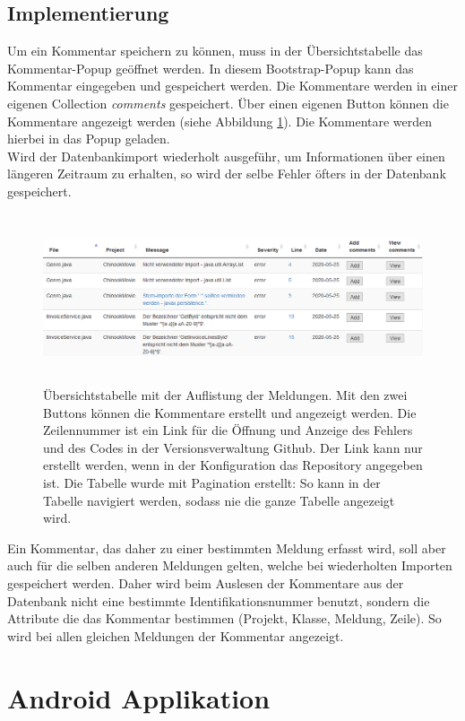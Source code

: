 \subsection{Implementierung}
Um ein Kommentar speichern zu können, muss in der Übersichtstabelle das Kommentar-Popup geöffnet werden. In diesem Bootstrap-Popup kann das Kommentar eingegeben und gespeichert werden. Die Kommentare werden in einer eigenen Collection \textit{comments} gespeichert. Über einen eigenen Button können die Kommentare angezeigt werden (siehe Abbildung \ref{fig:popup}). Die Kommentare werden hierbei in das Popup geladen. \\ Wird der Datenbankimport wiederholt ausgeführ, um Informationen über einen längeren Zeitraum zu erhalten, so wird der selbe Fehler öfters in der Datenbank gespeichert.
\begin{figure}[tp]
  \centering
  \includegraphics[height=5cm]{images/table.PNG}
 \caption[Übersichtstabelle]{Übersichtstabelle mit der Auflistung der Meldungen. Mit den zwei Buttons können die Kommentare erstellt und angezeigt werden. Die Zeilennummer ist ein Link für die Öffnung und Anzeige des Fehlers und des Codes in der Versionsverwaltung Github. Der Link kann nur erstellt werden, wenn in der Konfiguration das Repository angegeben ist. Die Tabelle wurde mit Pagination erstellt: So kann in der Tabelle navigiert werden, sodass nie die ganze Tabelle angezeigt wird. }
  \label{fig:popup}
\end{figure}
Ein Kommentar, das daher zu einer bestimmten Meldung erfasst wird, soll aber auch für die selben anderen Meldungen gelten, welche bei wiederholten Importen gespeichert werden. Daher wird beim Auslesen der Kommentare aus der Datenbank nicht eine bestimmte Identifikationsnummer benutzt, sondern die Attribute die das Kommentar bestimmen (Projekt, Klasse, Meldung, Zeile). So wird bei allen gleichen Meldungen der Kommentar angezeigt.
\section{Android Applikation}
